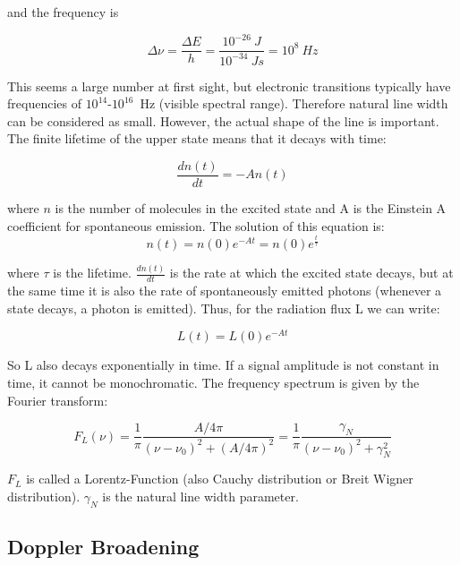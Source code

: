 and the frequency is

\begin{equation}
\Delta \nu = \frac{\Delta E}{h} = \frac{10^{-26}~J}{10^{-34}~Js} = 10^{8}~Hz
\end{equation}

This seems a large number at first sight, but electronic transitions typically have frequencies of $10^{14}$-$10^{16}$~Hz (visible spectral range). 
Therefore natural line width can be considered as small. However, the actual shape of the line is important.  \\

The finite lifetime of the upper state means that it decays with time:
 
\begin{equation}
\frac{dn(t)}{dt} = -A n(t)
\end{equation}

where $n$ is the number of molecules in the excited state and A is the Einstein A coefficient for spontaneous emission. The solution of this equation is:
\begin{equation}
n(t) = n(0) e^{-At} = n(0) e^{\frac{t}{\tau}}
\end{equation}

where $\tau$ is the lifetime. $\frac{dn(t)}{dt}$ is the rate at which the excited state decays, but at the same time it is also the rate of spontaneously emitted photons (whenever a state decays, a photon is emitted). Thus, for the radiation flux L we can write: 

\begin{equation}
L(t) = L(0) e^{-At} 
\end{equation}

So L also decays exponentially in time. If a signal amplitude is not constant in time, it cannot be monochromatic. The frequency spectrum is given by the Fourier transform: 

\begin{equation}
F_{L}(\nu) = \frac{1}{\pi} \frac{A/4\pi}{(\nu - \nu_{0})^{2} + (A/4\pi)^{2}} = \frac{1}{\pi} \frac{\gamma_{N}}{(\nu - \nu_{0})^{2} + \gamma_{N}^{2}} 
\end{equation}

$F_{L}$ is called a Lorentz-Function (also Cauchy distribution or Breit Wigner distribution). $\gamma_{N}$ is the natural line width parameter. 

\subsection{Doppler Broadening}

